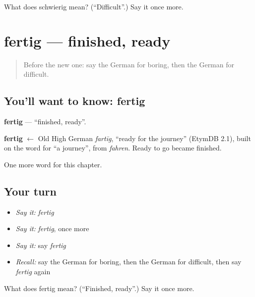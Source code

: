 \begin{tcolorbox}[breakable,colback=teal!4,colframe=teal!35!black,title={Before you move on}]
What does schwierig mean? (\textquotedblleft{}Difficult\textquotedblright{}.) Say it once more.
\end{tcolorbox}
\section[fertig]{fertig — finished, ready}

\label{lesson:GE-C134-fertig}



\begin{quote}
Before the new one: say the German for boring, then the German for difficult.
\end{quote}

\subsection*{You'll want to know: fertig}
\textbf{fertig} — \textquotedblleft{}finished, ready\textquotedblright{}.

\begin{cousinweb}
\textbf{fertig} $\leftarrow$ Old High German \emph{fartīg}, \textquotedblleft{}ready for the journey\textquotedblright{} (EtymDB 2.1), built on the word for \textquotedblleft{}a journey\textquotedblright{}, from \emph{fahren}. Ready to go became finished.
\end{cousinweb}

\begin{grammarlens}[title={What you've built}]
One more word for this chapter.
\end{grammarlens}

\subsection*{Your turn}
\begin{itemize}
\raggedright
  \item \emph{Say it:} \emph{fertig}
  \item \emph{Say it:} \emph{fertig}, once more
  \item \emph{Say it:} say \emph{fertig}
  \item \emph{Recall:} say the German for boring, then the German for difficult, then say \emph{fertig} again
\end{itemize}

\begin{tcolorbox}[breakable,colback=teal!4,colframe=teal!35!black,title={Before you move on}]
What does fertig mean? (\textquotedblleft{}Finished, ready\textquotedblright{}.) Say it once more.
\end{tcolorbox}
